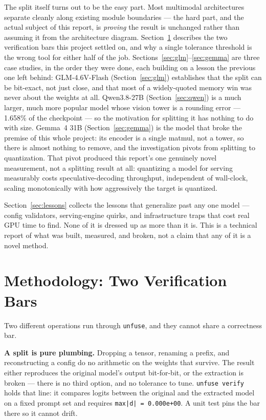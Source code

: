\documentclass[11pt]{article}
\begin{document}
The split itself turns out to be the easy part. Most multimodal architectures separate
cleanly along existing module boundaries --- the hard part, and the actual subject of
this report, is \emph{proving} the result is unchanged rather than assuming it from the
architecture diagram. Section~\ref{sec:methodology} describes the two verification bars
this project settled on, and why a single tolerance threshold is the wrong tool for
either half of the job. Sections~\ref{sec:glm}--\ref{sec:gemma} are three case studies,
in the order they were done, each building on a lesson the previous one left behind:
GLM-4.6V-Flash (Section~\ref{sec:glm}) establishes that the split can be bit-exact, not
just close, and that most of a widely-quoted memory win was never about the weights at
all. Qwen3.8-27B (Section~\ref{sec:qwen}) is a much larger, much more popular model
whose vision tower is a rounding error --- 1.658\% of the checkpoint --- so the
motivation for splitting it has nothing to do with size. Gemma~4 31B
(Section~\ref{sec:gemma}) is the model that broke the premise of this whole project: its
encoder is a single matmul, not a tower, so there is almost nothing to remove, and the
investigation pivots from splitting to quantization. That pivot produced this report's
one genuinely novel measurement, not a splitting result at all: quantizing a model for
serving measurably costs speculative-decoding throughput, independent of wall-clock,
scaling monotonically with how aggressively the target is quantized.

Section~\ref{sec:lessons} collects the lessons that generalize past any one model ---
config validators, serving-engine quirks, and infrastructure traps that cost real GPU
time to find. None of it is dressed up as more than it is. This is a technical report of
what was built, measured, and broken, not a claim that any of it is a novel method.

\section{Methodology: Two Verification Bars}
\label{sec:methodology}

Two different operations run through \texttt{unfuse}, and they cannot share a
correctness bar.

\textbf{A split is pure plumbing.} Dropping a tensor, renaming a prefix, and
reconstructing a config do no arithmetic on the weights that survive. The result either
reproduces the original model's output bit-for-bit, or the extraction is broken --- there
is no third option, and no tolerance to tune. \texttt{unfuse verify} holds that line: it
compares logits between the original and the extracted model on a fixed prompt set and
requires \texttt{max|d| = 0.000e+00}. A unit test pins the bar there so it cannot drift.
\end{document}
